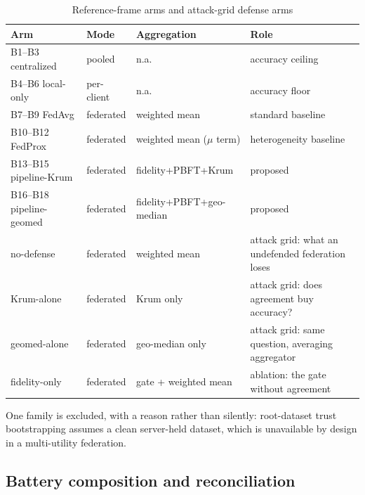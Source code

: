 \documentclass[review,12pt]{elsarticle}
\begin{document}
\begin{table}[tbp]
\centering
\caption{Reference-frame arms and attack-grid defense arms}
\label{tab:arms}
\scriptsize
\setlength{\tabcolsep}{2pt}%
\renewcommand{\arraystretch}{1.15}%
\begin{tabularx}{\linewidth}{@{}l l l L@{}}
\toprule
Arm & Mode & Aggregation & Role \\
\midrule
B1--B3 centralized      & pooled       & n.a. & accuracy ceiling \\
B4--B6 local-only       & per-client   & n.a. & accuracy floor \\
B7--B9 FedAvg           & federated    & weighted mean            & standard baseline \\
B10--B12 FedProx        & federated    & weighted mean ($\mu$ term) & heterogeneity baseline \\
B13--B15 pipeline-Krum  & federated    & fidelity+PBFT+Krum       & proposed \\
B16--B18 pipeline-geomed& federated    & fidelity+PBFT+geo-median & proposed \\
\midrule
no-defense             & federated    & weighted mean            & attack grid: what an undefended federation loses \\
Krum-alone             & federated    & Krum only                & attack grid: does agreement buy accuracy? \\
geomed-alone           & federated    & geo-median only          & attack grid: same question, averaging aggregator \\
fidelity-only          & federated    & gate + weighted mean     & ablation: the gate without agreement \\
\bottomrule
\end{tabularx}
\end{table}

One family is excluded, with a reason rather than silently:
root-dataset trust bootstrapping \cite{cao2021fltrust} assumes a clean
server-held dataset, which is unavailable by design in a multi-utility
federation.

\subsection{Battery composition and reconciliation}
\label{sec:sup-battery}
\end{document}
